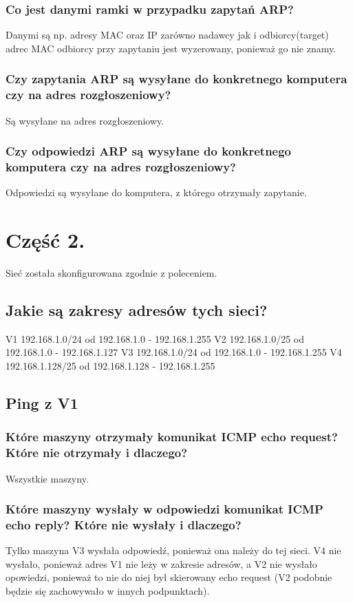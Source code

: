 \documentclass{article}
\begin{document}
\subsubsection{Co jest danymi ramki w przypadku zapytań ARP?} Danymi są np. adresy MAC oraz IP zarówno nadawcy jak i odbiorcy(target) adrec MAC odbiorcy przy zapytaniu jest wyzerowany, ponieważ go nie znamy.
\subsubsection{Czy zapytania ARP są wysyłane do konkretnego komputera czy na adres rozgłoszeniowy?}
Są wysyłane na adres rozgłoszeniowy.
\subsubsection{Czy odpowiedzi ARP są wysyłane do konkretnego komputera czy na adres rozgłoszeniowy?}
Odpowiedzi są wysyłane do komputera, z którego otrzymały zapytanie.

\section{Część 2.}
Sieć została skonfigurowana zgodnie z poleceniem.
\subsection{Jakie są zakresy adresów tych sieci?}
\tabto{0.4cm} V1 192.168.1.0/24 od 192.168.1.0 - 192.168.1.255
\tabto{0.4cm} V2 192.168.1.0/25 od 192.168.1.0 - 192.168.1.127
\tabto{0.4cm} V3 192.168.1.0/24 od 192.168.1.0 - 192.168.1.255
\tabto{0.4cm} V4 192.168.1.128/25 od 192.168.1.128 - 192.168.1.255
\subsection{Ping z V1}

\subsubsection{Które maszyny otrzymały komunikat ICMP echo request? Które nie otrzymały i dlaczego?}
Wszystkie maszyny.

\subsubsection{Które maszyny wysłały w odpowiedzi komunikat ICMP echo reply? Które nie wysłały i dlaczego?}
Tylko maszyna V3 wysłała odpowiedź, ponieważ ona należy do tej sieci. V4 nie wysłało, ponieważ adres V1 nie leży w zakresie adresów, a V2 nie wysłało opowiedzi, ponieważ to nie do niej był skierowany echo request (V2 podobnie będzie się zachowywało w innych podpunktach).
\end{document}
